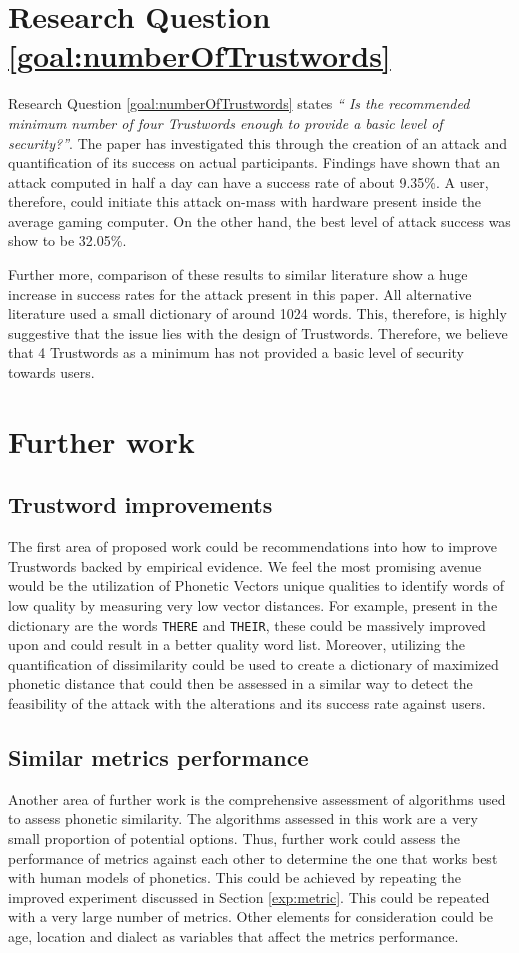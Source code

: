\section{Research Question \ref{goal:numberOfTrustwords}}
Research Question \ref{goal:numberOfTrustwords} states \textit{`` Is the recommended minimum number of four Trustwords enough to provide a basic level of security?''}. The paper has investigated this through the creation of an attack and quantification of its success on actual participants. Findings have shown that an attack computed in half a day can have a success rate of about 9.35\%. A user, therefore, could initiate this attack on-mass with hardware present inside the average gaming computer. On the other hand, the best level of attack success was show to be 32.05\%. 

Further more, comparison of these results to similar literature show a huge increase in success rates for the attack present in this paper. All alternative literature used a small dictionary of around 1024 words. This, therefore, is highly suggestive that the issue lies with the design of Trustwords. Therefore, we believe that 4 Trustwords as a minimum has not provided a basic level of security towards users.

\section{Further work}

\subsection*{Trustword improvements}
The first area of proposed work could be recommendations into how to improve Trustwords backed by empirical evidence. We feel the most promising avenue would be the utilization of Phonetic Vectors unique qualities to identify words of low quality by measuring very low vector distances. For example, present in the dictionary are the words \verb|THERE| and \verb|THEIR|, these could be massively improved upon and could result in a better quality word list. Moreover, utilizing the quantification of dissimilarity could be used to create a dictionary of maximized phonetic distance that could then be assessed in a similar way to detect the feasibility of the attack with the alterations and its success rate against users.

\subsection*{Similar metrics performance}
Another area of further work is the comprehensive assessment of algorithms used to assess phonetic similarity. The algorithms assessed in this work are a very small proportion of potential options. Thus, further work could assess the performance of metrics against each other to determine the one that works best with human models of phonetics. This could be achieved by repeating the improved experiment discussed in Section \ref{exp:metric}. This could be repeated with a very large number of metrics. Other elements for consideration could be age, location and dialect as variables that affect the metrics performance. 

